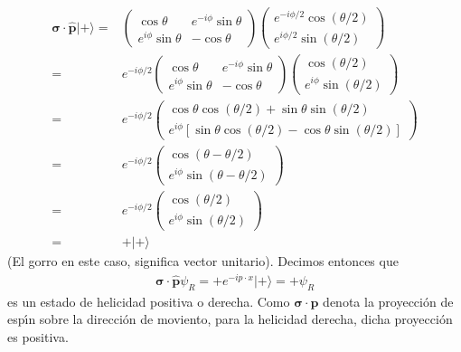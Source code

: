 \begin{align}
\boldsymbol{\sigma}\cdot\hat{\mathbf{p}}|+\rangle=&\begin{pmatrix}
    \cos\theta&e^{-i\phi}\sin\theta\\
    e^{i\phi}\sin\theta&-\cos\theta
  \end{pmatrix}\begin{pmatrix}
  e^{-i \phi/2}\cos(\theta/2)\\
  e^{i \phi/2}\sin(\theta/2)
  \end{pmatrix}\nonumber\\
  =&e^{-i\phi/2}\begin{pmatrix}
    \cos\theta&e^{-i\phi}\sin\theta\\
    e^{i\phi}\sin\theta&-\cos\theta
  \end{pmatrix}\begin{pmatrix}
  \cos(\theta/2)\\
  e^{i \phi}\sin(\theta/2)
  \end{pmatrix}\nonumber\\
  =&e^{-i\phi/2}
  \begin{pmatrix}
    \cos\theta\cos(\theta/2)+\sin\theta\sin(\theta/2)\\
    e^{i\phi}[\sin\theta\cos(\theta/2)- \cos\theta\sin(\theta/2)]
  \end{pmatrix}\nonumber\\
  =&e^{-i\phi/2}
  \begin{pmatrix}
    \cos(\theta-\theta/2)\\
    e^{i\phi}\sin(\theta-\theta/2)
  \end{pmatrix}\nonumber\\
  =&e^{-i\phi/2}
  \begin{pmatrix}
    \cos(\theta/2)\\
    e^{i\phi}\sin(\theta/2)
  \end{pmatrix}\nonumber\\
  =&+|+\rangle
\end{align}
(El gorro en este caso, significa vector unitario). Decimos entonces que
\begin{align}
\label{eq:214}
\boldsymbol{\sigma}\cdot\hat{\mathbf{p}}\psi_R=+e^{-i p\cdot x}|+\rangle=+\psi_R
\end{align}
es un estado de helicidad positiva o derecha. Como $\boldsymbol{\sigma}\cdot\mathbf{p}$ denota la proyecci\'on de esp\'\i n sobre la direcci\'on de moviento, para la helicidad derecha, dicha proyecci\'on es positiva.


